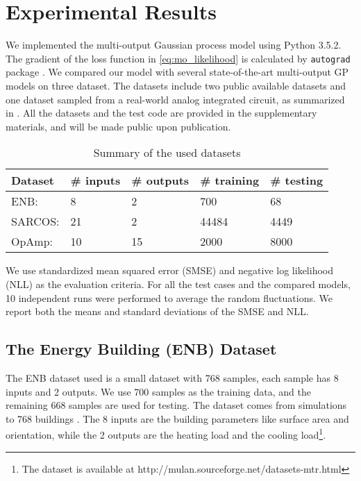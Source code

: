 \section{Experimental Results}\label{sec:experiments}


We implemented the multi-output Gaussian process model using Python 3.5.2. The gradient of the loss function in \eqref{eq:mo_likelihood} is calculated by \texttt{autograd} package \cite{maclaurin2015autograd}. We compared our model with several state-of-the-art multi-output GP models on three dataset. The datasets include two public available datasets and one dataset sampled from a real-world analog integrated circuit, as summarized in . All the datasets and the test code are provided in the supplementary materials, and will be made public upon publication.

\begin{table}[!htb]
    \centering
    \caption{Summary of the used datasets}
    \label{tab:datasets}
    \begin{tabular}{lllll}
        \toprule
        Dataset & \# inputs & \# outputs & \# training & \# testing \\ \midrule
        ENB:    & 8         & 2          & 700         & 68  \\
        SARCOS: & 21        & 2          & 44484       & 4449 \\
        OpAmp:  & 10        & 15         & 2000        & 8000 \\
        \bottomrule
    \end{tabular}
\end{table}
We use standardized mean squared error (SMSE) and negative log likelihood (NLL) as the evaluation criteria. For all the test cases and the compared models, 10 independent runs were performed to average the random fluctuations. We report both the means and standard deviations of the SMSE and NLL.

\subsection{The Energy Building (ENB) Dataset}\label{sec:enb}

The ENB dataset used is a small dataset with 768 samples, each sample has 8 inputs and 2 outputs. We use 700 samples as the training data, and the remaining 668 samples are used for testing. The dataset comes from simulations to 768 buildings \cite{spyromitros2016multi, tsanas2012accurate}. The 8 inputs are the building parameters like surface area and orientation, while the 2 outputs are the heating load and the cooling load\footnote{The dataset is available at http://mulan.sourceforge.net/datasets-mtr.html}.

